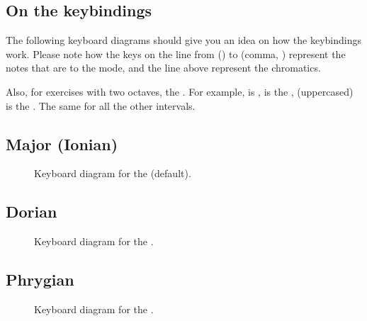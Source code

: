 \documentclass[letterpaper,10pt,english]{sphinxmanual}
\begin{document}
\subsection{On the keybindings}
\label{\detokenize{index:on-the-keybindings}}
The following keyboard diagrams should give you an idea on how the
keybindings work. Please note how the keys on the line from 
() to \sphinxcode{\sphinxupquote{,}} (comma, ) represent the notes that are
 to the mode, and the line above represent the chromatics.

Also, for exercises with two octaves, the . For example,  is , \sphinxcode{\sphinxupquote{,}} is the
,  (uppercased) is the . The same for all the other
intervals.


\subsection{Major (Ionian)}
\label{\detokenize{index:major-ionian}}
\begin{figure}[htbp]
\centering
\capstart

\noindent{}
\caption{Keyboard diagram for the  (default).}\label{\detokenize{index:id14}}\end{figure}


\subsection{Dorian}
\label{\detokenize{index:dorian}}
\begin{figure}[htbp]
\centering
\capstart

\noindent{}
\caption{Keyboard diagram for the .}\label{\detokenize{index:id15}}\end{figure}


\subsection{Phrygian}
\label{\detokenize{index:phrygian}}
\begin{figure}[htbp]
\centering
\capstart

\noindent{}
\caption{Keyboard diagram for the .}\label{\detokenize{index:id16}}\end{figure}
\end{document}
